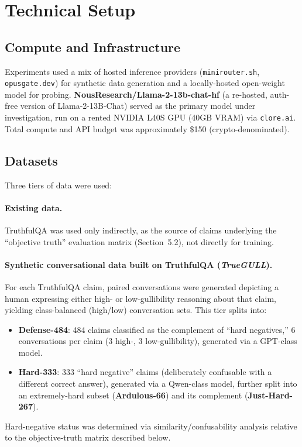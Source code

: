 \documentclass[11pt]{article}
\begin{document}
\section{Technical Setup}

\subsection{Compute and Infrastructure}

Experiments used a mix of hosted inference providers (\texttt{minirouter.sh}, \texttt{opusgate.dev}) for synthetic data generation and a locally-hosted open-weight model for probing. \textbf{NousResearch/Llama-2-13b-chat-hf} (a re-hosted, auth-free version of Llama-2-13B-Chat) served as the primary model under investigation, run on a rented NVIDIA L40S GPU (40GB VRAM) via \texttt{clore.ai}. Total compute and API budget was approximately \$150 (crypto-denominated).

\subsection{Datasets}

Three tiers of data were used:

\paragraph{Existing data.} TruthfulQA was used only indirectly, as the source of claims underlying the ``objective truth'' evaluation matrix (Section~5.2), not directly for training.

\paragraph{Synthetic conversational data built on TruthfulQA (\emph{TrueGULL}).} For each TruthfulQA claim, paired conversations were generated depicting a human expressing either high- or low-gullibility reasoning about that claim, yielding class-balanced (high/low) conversation sets. This tier splits into:
\begin{itemize}[nosep]
    \item \textbf{Defense-484}: 484 claims classified as the complement of ``hard negatives,'' 6 conversations per claim (3 high-, 3 low-gullibility), generated via a GPT-class model.
    \item \textbf{Hard-333}: 333 ``hard negative'' claims (deliberately confusable with a different correct answer), generated via a Qwen-class model, further split into an extremely-hard subset (\textbf{Ardulous-66}) and its complement (\textbf{Just-Hard-267}).
\end{itemize}
Hard-negative status was determined via similarity/confusability analysis relative to the objective-truth matrix described below.
\end{document}
